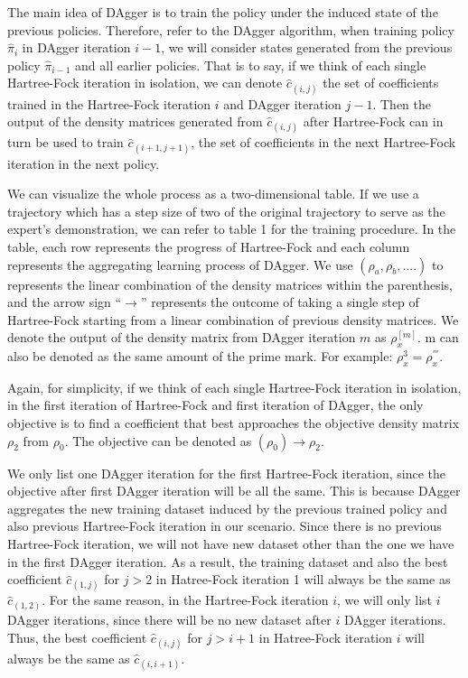 \documentclass[twoside]{article}
\begin{document}
The main idea of DAgger is to train the policy under the induced state of the previous policies. Therefore, refer to the DAgger algorithm, when training policy $\hat{\pi}_{i}$ in DAgger iteration $i-1$,
we will consider states generated from the previous policy $\hat{\pi}_{i-1}$ and all earlier policies. That is to say, if we think of each single Hartree-Fock iteration in isolation, we can denote $\hat{c}_{(i,j)}$ the set of coefficients trained in the Hartree-Fock iteration $i$ and DAgger iteration $j-1$. Then the output of the density matrices generated from $\hat{c}_{(i,j)}$ after Hartree-Fock can in turn be used to train $\hat{c}_{(i+1,j+1)}$, the set of coefficients in the next Hartree-Fock iteration in the next policy.


We can visualize the whole process as a two-dimensional table. If we use a trajectory which has a step size of two of the original trajectory to serve as the expert's demonstration, we can refer to table 1 for the training procedure.
In the table, each row represents the progress of Hartree-Fock and each column represents the aggregating learning process of DAgger. We use $(\rho_a, \rho_b, ....)$ to represents the linear combination of the density matrices within the parenthesis, and the arrow sign ``$\rightarrow$'' represents the outcome of taking a single step of Hartree-Fock starting from a linear combination of previous density matrices. We denote the output of the density matrix from DAgger iteration $m$ as $\rho_x^{[m]}$. m can also be denoted as the same amount of the prime mark. For example: $\rho_x^{3} = \rho_x^{'''}$.

Again, for simplicity, if we think of each single Hartree-Fock iteration in isolation, in the first iteration of Hartree-Fock and first iteration of DAgger, the only objective is to find a coefficient that best approaches the objective density matrix $\rho_2$ from  $\rho_0$. The objective can be denoted as $(\rho_0) \rightarrow \rho_2$. 

We only list one DAgger iteration for the first Hartree-Fock iteration, since the objective after first DAgger iteration will be all the same. This is because DAgger aggregates the new training dataset induced by the previous trained policy and also previous Hartree-Fock iteration in our scenario. Since there is no previous Hartree-Fock iteration, we will not have new dataset other than the one we have in the first DAgger iteration. As a result, the training dataset and also the best coefficient $\hat{c}_{(1,j)}$ for $j>2$ in Hatree-Fock iteration 1 will always be the same as $\hat{c}_{(1,2)}$. For the same reason, in the Hartree-Fock iteration $i$, we will only list $i$ DAgger iterations, since there will be no new dataset after $i$ DAgger iterations. Thus, the best coefficient $\hat{c}_{(i,j)}$ for $j>i+1$ in Hatree-Fock iteration $i$ will always be the same as $\hat{c}_{(i,i+1)}$.
\end{document}
